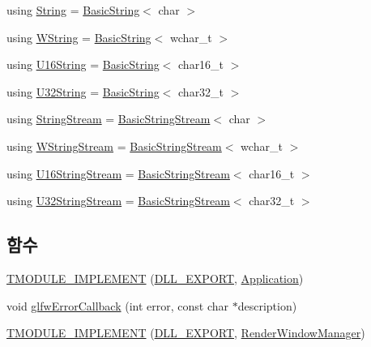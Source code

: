 \begin{DoxyCompactItemize}
using \hyperlink{namespacecpf_a4dbd6992c3ed4440ce7ed8982ff7ffea}{String} = \hyperlink{namespacecpf_ac91c8c57a370a5bef21ac23f876ad536}{Basic\+String}$<$ char $>$
\item 
using \hyperlink{namespacecpf_ad36115a5fb55fb1cc257eeab6aed2d7a}{W\+String} = \hyperlink{namespacecpf_ac91c8c57a370a5bef21ac23f876ad536}{Basic\+String}$<$ wchar\+\_\+t $>$
\item 
using \hyperlink{namespacecpf_a32926a91098f8ea8d354b9f234b75acc}{U16\+String} = \hyperlink{namespacecpf_ac91c8c57a370a5bef21ac23f876ad536}{Basic\+String}$<$ char16\+\_\+t $>$
\item 
using \hyperlink{namespacecpf_a71279c3a3d59ed723c48245204f8c0e5}{U32\+String} = \hyperlink{namespacecpf_ac91c8c57a370a5bef21ac23f876ad536}{Basic\+String}$<$ char32\+\_\+t $>$
\item 
using \hyperlink{namespacecpf_a6e5583a51165e808f1a480563a2d98b2}{String\+Stream} = \hyperlink{namespacecpf_a1fe334b3d2422535a1cfe51785d98cb8}{Basic\+String\+Stream}$<$ char $>$
\item 
using \hyperlink{namespacecpf_a7e79dec7a6790331bee7ef1e85dafba6}{W\+String\+Stream} = \hyperlink{namespacecpf_a1fe334b3d2422535a1cfe51785d98cb8}{Basic\+String\+Stream}$<$ wchar\+\_\+t $>$
\item 
using \hyperlink{namespacecpf_a401e80bf9227c14c3f1f27121ba489d1}{U16\+String\+Stream} = \hyperlink{namespacecpf_a1fe334b3d2422535a1cfe51785d98cb8}{Basic\+String\+Stream}$<$ char16\+\_\+t $>$
\item 
using \hyperlink{namespacecpf_a7e95b195d831b69d8e661dd685128097}{U32\+String\+Stream} = \hyperlink{namespacecpf_a1fe334b3d2422535a1cfe51785d98cb8}{Basic\+String\+Stream}$<$ char32\+\_\+t $>$
\end{DoxyCompactItemize}
\subsection*{함수}
\begin{DoxyCompactItemize}
\item 
\hyperlink{namespacecpf_a795ee006ebcf092f9fa44444e150544e}{T\+M\+O\+D\+U\+L\+E\+\_\+\+I\+M\+P\+L\+E\+M\+E\+NT} (\hyperlink{_platform_defines_8hpp_a1ca888bd091694c05472e1b91df1a97b}{D\+L\+L\+\_\+\+E\+X\+P\+O\+RT}, \hyperlink{classcpf_1_1_application}{Application})
\item 
void \hyperlink{namespacecpf_a2aa8b9856909234833858da9b6c466dd}{glfw\+Error\+Callback} (int error, const char $\ast$description)
\item 
\hyperlink{namespacecpf_a1167b3088599fca20112d444efd29154}{T\+M\+O\+D\+U\+L\+E\+\_\+\+I\+M\+P\+L\+E\+M\+E\+NT} (\hyperlink{_platform_defines_8hpp_a1ca888bd091694c05472e1b91df1a97b}{D\+L\+L\+\_\+\+E\+X\+P\+O\+RT}, \hyperlink{classcpf_1_1_render_window_manager}{Render\+Window\+Manager})
\end{DoxyCompactItemize}


